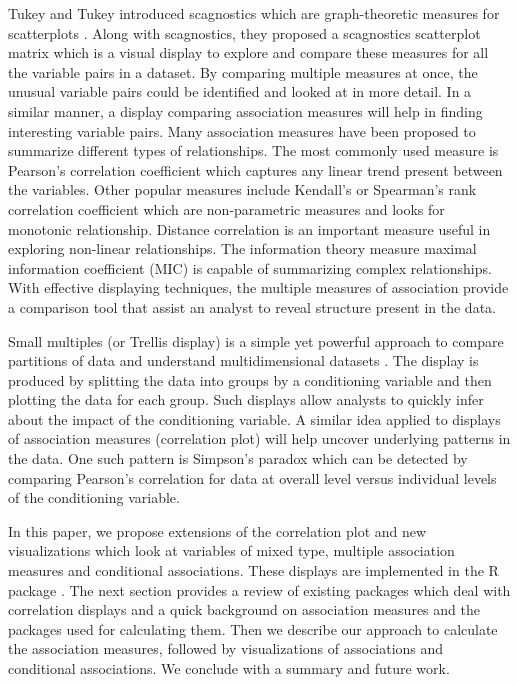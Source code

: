 Tukey and Tukey introduced scagnostics which are graph-theoretic
measures for scatterplots \citep{tukey1985computer}. Along with
scagnostics, they proposed a scagnostics scatterplot matrix which is a
visual display to explore and compare these measures for all the
variable pairs in a dataset. By comparing multiple measures at once, the
unusual variable pairs could be identified and looked at in more detail.
In a similar manner, a display comparing association measures will help
in finding interesting variable pairs. Many association measures have
been proposed to summarize different types of relationships. The most
commonly used measure is Pearson's correlation coefficient which
captures any linear trend present between the variables. Other popular
measures include Kendall's or Spearman's rank correlation coefficient
which are non-parametric measures and looks for monotonic relationship.
Distance correlation \citep{szekely2007measuring} is an important
measure useful in exploring non-linear relationships. The information
theory measure maximal information coefficient (MIC)
\citep{reshef2011detecting} is capable of summarizing complex
relationships. With effective displaying techniques, the multiple
measures of association provide a comparison tool that assist an analyst
to reveal structure present in the data.

Small multiples (or Trellis display) is a simple yet powerful approach
to compare partitions of data and understand multidimensional datasets
\citep{tufte1986thevisual}. The display is produced by splitting the
data into groups by a conditioning variable and then plotting the data
for each group. Such displays allow analysts to quickly infer about the
impact of the conditioning variable. A similar idea applied to displays
of association measures (correlation plot) will help uncover underlying
patterns in the data. One such pattern is Simpson's paradox which can be
detected by comparing Pearson's correlation for data at overall level
versus individual levels of the conditioning variable.

In this paper, we propose extensions of the correlation plot and new
visualizations which look at variables of mixed type, multiple
association measures and conditional associations. These displays are
implemented in the R package . The next section provides
a review of existing packages which deal with correlation displays and a
quick background on association measures and the packages used for
calculating them. Then we describe our approach to calculate the
association measures, followed by visualizations of associations and
conditional associations. We conclude with a summary and future work.

